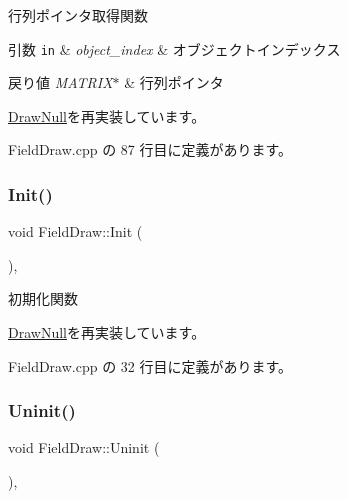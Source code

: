 行列ポインタ取得関数 


\begin{DoxyParams}[1]{引数}
\mbox{\tt in}  & {\em object\+\_\+index} & オブジェクトインデックス \\
\hline
\end{DoxyParams}

\begin{DoxyRetVals}{戻り値}
{\em M\+A\+T\+R\+I\+X$\ast$} & 行列ポインタ \\
\hline
\end{DoxyRetVals}


\mbox{\hyperlink{class_draw_null_a9aac059eb3b5d1f77e8bd3aa0647cff9}{Draw\+Null}}を再実装しています。



 Field\+Draw.\+cpp の 87 行目に定義があります。

\mbox{\label{class_field_draw_a4287d2ce33033b2413c1d3a81b173373}} 
\subsubsection{\texorpdfstring{Init()}{Init()}}
{\footnotesize\ttfamily void Field\+Draw\+::\+Init (\begin{DoxyParamCaption}{ }\end{DoxyParamCaption})\hspace{0.3cm}{\ttfamily [override]}, {\ttfamily [virtual]}}



初期化関数 



\mbox{\hyperlink{class_draw_null_a20aef1e54c1a158b741bfd731e18efdf}{Draw\+Null}}を再実装しています。



 Field\+Draw.\+cpp の 32 行目に定義があります。

\mbox{\label{class_field_draw_a89a78212c141714d9e39e25e663aaeff}} 
\subsubsection{\texorpdfstring{Uninit()}{Uninit()}}
{\footnotesize\ttfamily void Field\+Draw\+::\+Uninit (\begin{DoxyParamCaption}{ }\end{DoxyParamCaption})\hspace{0.3cm}{\ttfamily [override]}, {\ttfamily [virtual]}}



